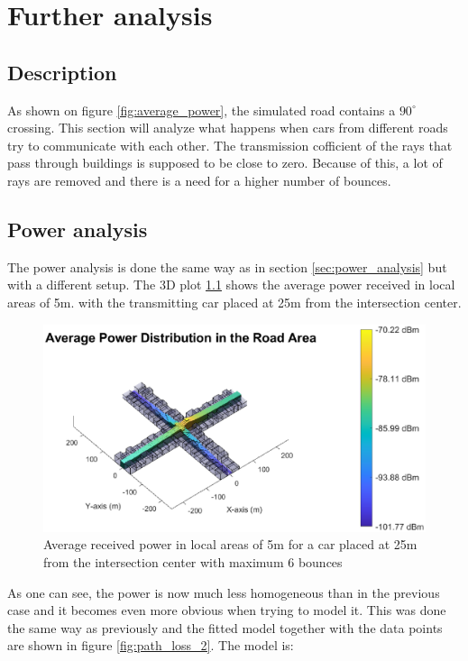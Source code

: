 \documentclass[10pt,a4paper]{ULBreport}
\begin{document}
\chapter{Further analysis}
\section{Description}
As shown on figure \ref{fig:average_power}, the simulated road contains a $90^\circ$ crossing. This section will analyze what happens when cars from different roads try to communicate with each other. The transmission cofficient of the rays that pass through buildings is supposed to be close to zero. Because of this, a lot of rays are removed and there is a need for a higher number of bounces. \\
\section{Power analysis}
The power analysis is done the same way as in section \ref{sec:power_analysis} but with a different setup. The 3D plot \ref{fig:3D_2} shows the average power received in local areas of 5m. with the transmitting car placed at 25m from the intersection center.

\begin{figure}
    \centering
    \includegraphics[width=1\textwidth]{6_1.eps}
    \caption{Average received power in local areas of 5m for a car placed at 25m from the intersection center with maximum 6 bounces}
    \label{fig:3D_2}
\end{figure}


As one can see, the power is now much less homogeneous than in the previous case and it becomes even more obvious when trying to model it. This was done the same way as previously and the fitted model together with the data points are shown in figure \ref{fig:path_loss_2}. The model is:
\vspace{-1cm}
\end{document}
